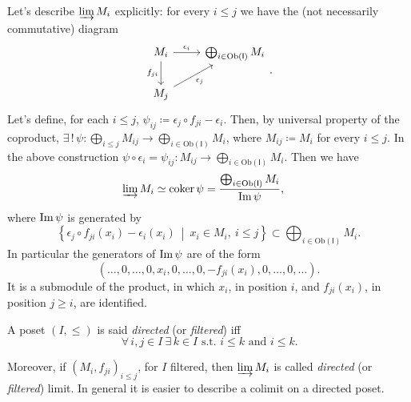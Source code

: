 \begin{ex}
	Let's describe $\varinjlim M_i$ explicitly: for every $i \leq j$ we have the (not necessarily commutative) diagram
	\begin{equation}
	\begin{tikzcd}
		M_i \arrow[r, "\epsilon_i", rightarrow] \arrow[d, "f_{ji}"', rightarrow] &
		\bigoplus_{i \in \mathrm{Ob} \left(\mathsf{I}\right)} M_i \\
		M_j \arrow[ru, "\epsilon_j"', rightarrow] & 
	\end{tikzcd} 
	.\end{equation}
	Let's define, for each $i \leq j$, $\psi_{ij} \coloneqq \epsilon_j \circ f_{ji} - \epsilon_i$.
	Then, by universal property of the coproduct,
	$\exists\, !\, \psi\colon \bigoplus_{i \leq j} M_{ij} \to \bigoplus_{i \in \mathrm{Ob} \left(\mathsf{I}\right)} M_{i}$,
	where $M_{ij} \coloneqq M_i$ for every $i \leq j$.
	In the above construction $\psi \circ \epsilon_i = \psi_{ij}\colon M_{ij} \to \bigoplus_{i \in \mathrm{Ob} \left(\mathsf{I}\right)} M_i$.
	Then we have
	\begin{align}
		\varinjlim M_i &\simeq \operatorname{coker} \psi =
		\frac{\bigoplus_{i \in \mathrm{Ob} \left(\mathsf{I}\right)} M_i}{\operatorname{Im} \psi}
	,\end{align}
	where $\operatorname{Im} \psi$ is generated by
	\begin{equation}
		\left\{ \epsilon_j \circ f_{ji}(x_i) - \epsilon_i(x_i) \ \middle|\ 
		x_i \in M_i,\ i \leq j \right\} \subset
		\bigoplus_{i \in \mathrm{Ob} \left(\mathsf{I}\right)} M_i
	.\end{equation} 
	In particular the generators of $\operatorname{Im} \psi$ are of the form
	\begin{equation}
		\left( \ldots, 0, \ldots, 
		0, x_i, 0, \ldots, 0, - f_{ji}(x_i),
		0, \ldots, 0, \ldots \right)
	.\end{equation} 	
	It is a submodule of the product, in which $x_i$, in position $i$,
	and $f_{ji}(x_i)$, in position $j \geq i$, are identified.
\end{ex}

\begin{defn}
	A poset $\left(I, \leq \right)$ is said {\em directed} (or {\em filtered}) iff
	\begin{equation}
	\,\forall\,  i, j \in I \ \exists\, k \in I \text{ s.t. } i \leq k \text{ and } i \leq k
	.\end{equation} 
\end{defn}
Moreover, if $\left(M_i, f_{ji}\right)_{i \leq j}$, for $I$ filtered, then $\varinjlim M_i$ is called
{\em directed} (or {\em filtered}) limit.
In general it is easier to describe a colimit on a directed poset.

